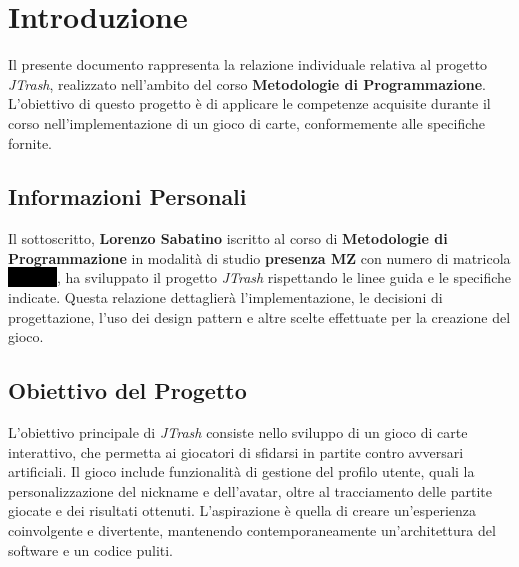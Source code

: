\section{Introduzione}
Il presente documento rappresenta la relazione individuale relativa al progetto \textit{JTrash}, realizzato nell'ambito del corso \textbf{Metodologie di Programmazione}. L'obiettivo di questo progetto è di applicare le competenze acquisite durante il corso nell'implementazione di un gioco di carte, conformemente alle specifiche fornite.

\subsection{Informazioni Personali}
Il sottoscritto, \textbf{Lorenzo Sabatino} iscritto al corso di \textbf{Metodologie di Programmazione} in modalità di studio \textbf{presenza MZ} con numero di matricola \textsf{\colorbox{black}{\textcolor{black}{0000000}}}, ha sviluppato il progetto \textit{JTrash} rispettando le linee guida e le specifiche indicate. Questa relazione dettaglierà l'implementazione, le decisioni di progettazione, l'uso dei design pattern e altre scelte effettuate per la creazione del gioco.

\subsection{Obiettivo del Progetto}
L'obiettivo principale di \textit{JTrash} consiste nello sviluppo di un gioco di carte interattivo, che permetta ai giocatori di sfidarsi in partite contro avversari artificiali. Il gioco include funzionalità di gestione del profilo utente, quali la personalizzazione del nickname e dell'avatar, oltre al tracciamento delle partite giocate e dei risultati ottenuti. L'aspirazione è quella di creare un'esperienza coinvolgente e divertente, mantenendo contemporaneamente un'architettura del software e un codice puliti.
